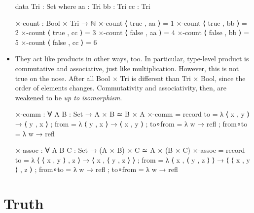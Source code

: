 \documentclass{lecturenotes}
\begin{document}
\begin{itemize}
\begin{code}
data Tri : Set where
  aa : Tri
  bb : Tri
  cc : Tri

×-count : Bool × Tri → ℕ
×-count ⟨ true , aa ⟩  = 1
×-count ⟨ true , bb ⟩  = 2
×-count ⟨ true , cc ⟩  = 3
×-count ⟨ false , aa ⟩ = 4
×-count ⟨ false , bb ⟩ = 5
×-count ⟨ false , cc ⟩ = 6
\end{code}
\pagebreak
\item They act like products in other ways, too.
  In particular, type-level product is commutative and associative, just like multiplication.
  However, this is not true on the nose.
  After all \textsf{Bool × Tri} is different than \textsf{Tri × Bool}, since the order of elements changes.
  Commutativity and associativity, then, are weakened to be \emph{up to isomorphism}.
\begin{code}
×-comm : ∀ {A B : Set} → A × B ≃ B × A
×-comm =
  record
  {
    to      = λ { ⟨ x , y ⟩ →  ⟨ y , x ⟩ }
  ; from    =  λ { ⟨ y , x ⟩ → ⟨ x , y ⟩ }
  ; to∘from = λ {w → refl } 
  ; from∘to = λ {w → refl}
  }

×-assoc : ∀ {A B C : Set} → (A × B) × C ≃ A × (B × C)
×-assoc =
  record
  {
    to      =  λ { ⟨ ⟨ x , y ⟩ , z ⟩ →  ⟨ x , ⟨ y , z ⟩ ⟩ }
  ; from    =  λ { ⟨ x , ⟨ y , z ⟩ ⟩ →  ⟨ ⟨ x , y ⟩ , z ⟩ }
  ; from∘to = λ {w → refl}
  ; to∘from = λ {w → refl}
  }
\end{code}
\end{itemize}

\section{Truth}
\label{sec:truth}
\end{document}
